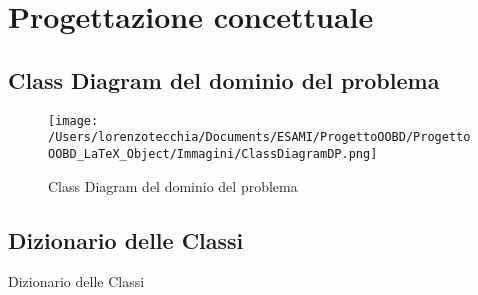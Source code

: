 \chapter{Progettazione concettuale}
    \section{Class Diagram del dominio del problema}
    	\begin{figure}[hbt]
  			\texttt{[image: /Users/lorenzotecchia/Documents/ESAMI/ProgettoOOBD/ProgettoOOBD\_LaTeX\_Object/Immagini/ClassDiagramDP.png]}
  			\caption{Class Diagram del dominio del problema}
	\end{figure}
    \newpage
    \begin{table}[]
\section{Dizionario delle Classi}
\caption{Dizionario delle Classi}

\label{tab:DizionarioClassi}


\end{table}
